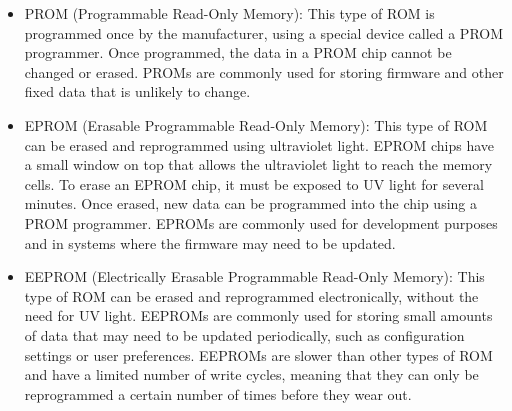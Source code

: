 \begin{itemize}
	\item PROM (Programmable Read-Only Memory): This type of ROM is programmed once by the manufacturer, using a special device called a PROM programmer. Once programmed, the data in a PROM chip cannot be changed or erased. PROMs are commonly used for storing firmware and other fixed data that is unlikely to change.

	\item EPROM (Erasable Programmable Read-Only Memory): This type of ROM can be erased and reprogrammed using ultraviolet light. EPROM chips have a small window on top that allows the ultraviolet light to reach the memory cells. To erase an EPROM chip, it must be exposed to UV light for several minutes. Once erased, new data can be programmed into the chip using a PROM programmer. EPROMs are commonly used for development purposes and in systems where the firmware may need to be updated.

	\item EEPROM (Electrically Erasable Programmable Read-Only Memory): This type of ROM can be erased and reprogrammed electronically, without the need for UV light. EEPROMs are commonly used for storing small amounts of data that may need to be updated periodically, such as configuration settings or user preferences. EEPROMs are slower than other types of ROM and have a limited number of write cycles, meaning that they can only be reprogrammed a certain number of times before they wear out.

\end{itemize}
